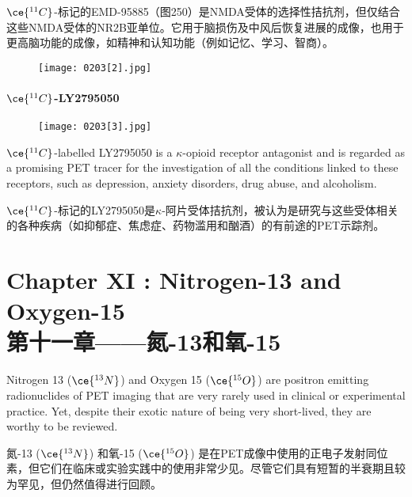 \documentclass[dvipsnames, svgnames,a4paper,11pt]{article}
\begin{document}
\(\ce{^{11}C}\)-标记的EMD-95885（图250）是NMDA受体的选择性拮抗剂，但仅结合这些NMDA受体的NR2B亚单位。它用于脑损伤及中风后恢复进展的成像，也用于更高脑功能的成像，如精神和认知功能（例如记忆、学习、智商）。

\begin{figure}[h]
	\centering
    \texttt{[image: 0203[2].jpg]}  
     \label{fig250}
\end{figure}

\paragraph{\(\ce{^{11}C}\)-LY2795050}  

\begin{wrapfigure}{r}{0.4\textwidth}
    \centering
    \texttt{[image: 0203[3].jpg]}
     \label{fig251}
\end{wrapfigure}

\(\ce{^{11}C}\)-labelled LY2795050 is a \(\kappa\)-opioid receptor antagonist and is regarded as a promising PET tracer for the investigation of all the conditions linked to these receptors, such as depression, anxiety disorders, drug abuse, and alcoholism.

\(\ce{^{11}C}\)-标记的LY2795050是\(\kappa\)-阿片受体拮抗剂，被认为是研究与这些受体相关的各种疾病（如抑郁症、焦虑症、药物滥用和酗酒）的有前途的PET示踪剂。

\newpage

\section{Chapter XI :   Nitrogen-13 and Oxygen-15 \\第十一章——氮-13和氧-15}

Nitrogen 13 (\(\ce{^{13}N}\)) and Oxygen 15 (\(\ce{^{15}O}\)) are positron emitting radionuclides of PET imaging that are very rarely used in clinical or experimental practice. Yet, despite their exotic nature of being very short-lived, they are worthy to be reviewed.

氮-13 (\(\ce{^{13}N}\)) 和氧-15 (\(\ce{^{15}O}\)) 是在PET成像中使用的正电子发射同位素，但它们在临床或实验实践中的使用非常少见。尽管它们具有短暂的半衰期且较为罕见，但仍然值得进行回顾。
\end{document}
